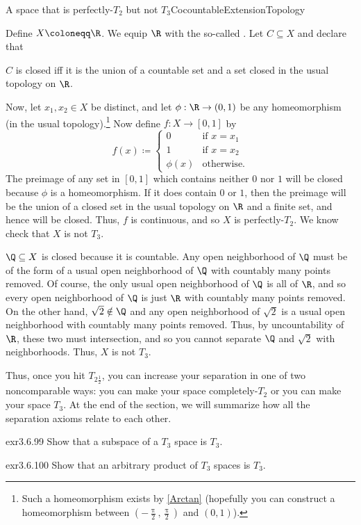 \begin{exm}{A space that is perfectly-$T_2$ but not $T_3$}{CocountableExtensionTopology}
\forwardref

\noindent
Define $X\coloneqq \R$.  We equip $\R$ with the so-called .  Let $C\subseteq X$ and declare that
\begin{textequation}
$C$ is closed iff it is the union of a countable set and a set closed in the usual topology on $\R$.
\end{textequation}

Now, let $x_1,x_2\in X$ be distinct, and let $\phi :\R \rightarrow (0,1)$ be any homeomorphism (in the usual topology).\footnote{Such a homeomorphism exists by \cref{Arctan} (hopefully you can construct a homeomorphism between $(-\frac{\uppi}{2},\frac{\uppi}{2})$ and $(0,1)$).}  Now define $f\colon X\rightarrow [0,1]$ by
\begin{equation}
f(x)\coloneqq \begin{cases}0 & \text{if }x=x_1 \\ 1 & \text{if }x=x_2 \\ \phi (x) & \text{otherwise.}\end{cases}
\end{equation}
The preimage of any set in $[0,1]$ which contains neither $0$ nor $1$ will be closed because $\phi$ is a homeomorphism.  If it does contain $0$ or $1$, then the preimage will be the union of a closed set in the usual topology on $\R$ and a finite set, and hence will be closed.  Thus, $f$ is continuous, and so $X$ is perfectly-$T_2$.  We know check that $X$ is not $T_3$.

$\Q \subseteq X$ is closed because it is countable.  Any open neighborhood of $\Q$ must be of the form of a usual open neighborhood of $\Q$ with countably many points removed.  Of course, the only usual open neighborhood of $\Q$ is all of $\R$, and so every open neighborhood of $\Q$ is just $\R$ with countably many points removed.  On the other hand, $\sqrt{2}\notin \Q$ and any open neighborhood of $\sqrt{2}$ is a usual open neighborhood with countably many points removed.  Thus, by uncountability of $\R$, these two must intersection, and so you cannot separate $\Q$ and $\sqrt{2}$ with neighborhoods.  Thus, $X$ is not $T_3$.
\end{exm}
Thus, once you hit $T_{2\frac{1}{2}}$, you can increase your separation in one of two noncomparable ways:  you can make your space completely-$T_2$ or you can make your space $T_3$.  At the end of the section, we will summarize how all the separation axioms relate to each other.
\begin{exr}{}{exr3.6.99}
Show that a subspace of a $T_3$ space is $T_3$.
\end{exr}
\begin{exr}{}{exr3.6.100}
Show that an arbitrary product of $T_3$ spaces is $T_3$.
\end{exr}

